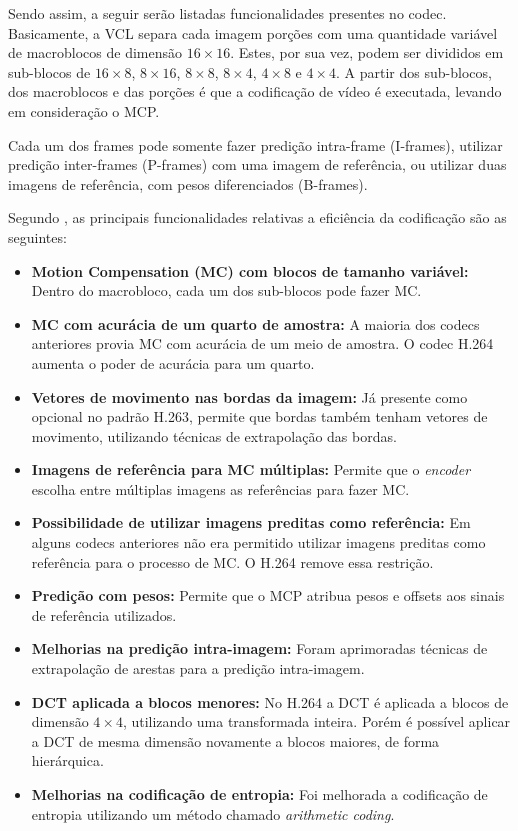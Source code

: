 \documentclass[cic,tc]{iiufrgs}
\begin{document}
Sendo assim, a seguir serão listadas funcionalidades presentes no codec.
Basicamente, a VCL separa cada imagem porções com uma quantidade variável de macroblocos 
de dimensão $16\times16$.
Estes, por sua vez, podem ser divididos em sub-blocos de $16\times8$, $8\times16$,
$8\times8$, $8\times4$, $4\times8$ e $4\times4$.
A partir dos sub-blocos, dos macroblocos e das porções é que a codificação de vídeo 
é executada, levando em consideração o MCP.

Cada um dos frames pode somente fazer predição intra-frame (I-frames), utilizar 
predição inter-frames (P-frames) com uma imagem de referência, ou utilizar 
duas imagens de referência, com pesos diferenciados (B-frames).

Segundo \citet{WiegangH264}, as principais funcionalidades relativas a eficiência
da codificação são as seguintes:
\begin{itemize}
    \item \textbf{Motion Compensation (MC) com blocos de tamanho variável:}
    Dentro do macrobloco, cada um dos sub-blocos pode fazer MC.
    \item \textbf{MC com acurácia de um quarto de amostra:} A maioria dos codecs anteriores 
    provia MC com acurácia de um meio de amostra. O codec H.264 aumenta o poder 
    de acurácia para um quarto.
    \item \textbf{Vetores de movimento nas bordas da imagem:} Já presente como opcional
    no padrão H.263, permite que bordas também tenham vetores de movimento, utilizando
    técnicas de extrapolação das bordas.
    \item \textbf{Imagens de referência para MC múltiplas:} Permite que o \textit{encoder}
    escolha entre múltiplas imagens as referências para fazer MC.
    \item \textbf{Possibilidade de utilizar imagens preditas como referência:} Em alguns 
    codecs anteriores não era permitido utilizar imagens preditas como referência para o 
    processo de MC. O H.264 remove essa restrição.
    \item \textbf{Predição com pesos:} Permite que o MCP atribua pesos e offsets aos 
    sinais de referência utilizados.
    \item \textbf{Melhorias na predição intra-imagem:} Foram aprimoradas técnicas de
    extrapolação de arestas para a predição intra-imagem.
    \item \textbf{DCT aplicada a blocos menores:} No H.264 a DCT é aplicada a blocos de 
    dimensão $4\times4$, utilizando uma transformada inteira. Porém é possível aplicar 
    a DCT de mesma dimensão novamente a blocos maiores, de forma hierárquica.
    \item \textbf{Melhorias na codificação de entropia:} Foi melhorada a codificação de 
    entropia utilizando um método chamado \emph{arithmetic coding}.
\end{itemize}
\end{document}
